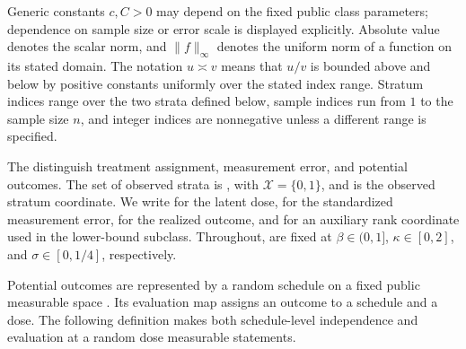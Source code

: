 \documentclass[11pt]{article}
\begin{document}
Generic constants \(c,C>0\) may depend on the fixed public class parameters; dependence on sample size or error scale is displayed explicitly. Absolute value denotes the scalar norm, and \(\|f\|_\infty\) denotes the uniform norm of a function on its stated domain. The notation \(u\asymp v\) means that \(u/v\) is bounded above and below by positive constants uniformly over the stated index range. Stratum indices range over the two strata defined below, sample indices run from \(1\) to the sample size \(n\), and integer indices are nonnegative unless a different range is specified.

The  distinguish treatment assignment, measurement error, and potential outcomes. The set of observed strata is , with \(\mathcal X=\{0,1\}\), and  is the observed stratum coordinate. We write  for the latent dose,  for the standardized measurement error,  for the realized outcome, and  for an auxiliary rank coordinate used in the lower-bound subclass. Throughout,  are fixed at \(\beta\in(0,1]\), \(\kappa\in[0,2]\), and \(\sigma\in[0,1/4]\), respectively.

Potential outcomes are represented by a random schedule on a fixed public measurable space . Its evaluation map  assigns an outcome to a schedule and a dose. The following definition makes both schedule-level independence and evaluation at a random dose measurable statements.
\end{document}
